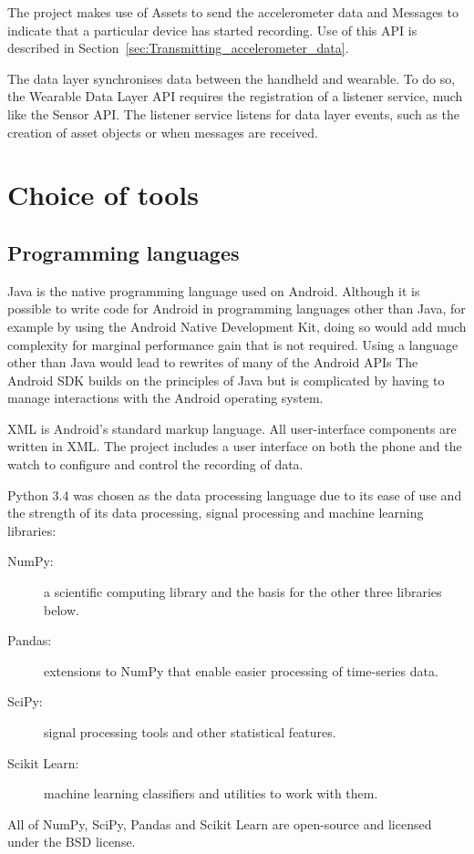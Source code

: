       The project makes use of Assets to send the accelerometer data and Messages to indicate that a particular device has started recording. Use of this API is described in Section~\ref{sec:Transmitting_accelerometer_data}.
      
      The data layer synchronises data between the handheld and wearable. To do so, the Wearable Data Layer API requires the registration of a listener service, much like the Sensor API. The listener service listens for data layer events, such as the creation of asset objects or when messages are received.      
      
  \section{Choice of tools}
    \subsection{Programming languages}
      \label{sec:programming_languages}
      Java is the native programming language used on Android. Although it is
      possible to write code for Android in programming languages other than Java, for example 
      by using the Android Native Development Kit, doing so would add much complexity for marginal performance gain that is not required. Using a language other than Java would lead to rewrites of many of the Android APIs The Android SDK builds on the principles of Java but is complicated by having to manage interactions with the Android operating system.
      
      XML is Android's standard markup language. All user-interface components are written in XML.
      The project includes a user interface on both the phone and the watch to configure and control the recording of data.
      
      Python 3.4 was chosen as the data processing language due to its ease of use and the strength of its data processing, signal processing and machine learning libraries:
      \begin{description}
        \item[NumPy:] a scientific computing library and the basis for the other three libraries below\cite{van2011numpy}.
        \item[Pandas:] extensions to NumPy that enable easier processing of time-series data\cite{pandas}.
        \item[SciPy:] signal processing tools and other statistical features\cite{scipy}.
        \item[Scikit Learn:] machine learning classifiers and utilities to work with them\cite{scikitlearn}.
      \end{description}
      All of NumPy, SciPy, Pandas and Scikit Learn are open-source and licensed under the BSD license.
